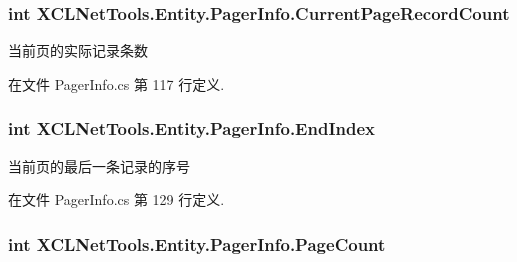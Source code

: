 \subsubsection[{\texorpdfstring{Current\+Page\+Record\+Count}{CurrentPageRecordCount}}]{\setlength{\rightskip}{0pt plus 5cm}int X\+C\+L\+Net\+Tools.\+Entity.\+Pager\+Info.\+Current\+Page\+Record\+Count\hspace{0.3cm}{\ttfamily [get]}}\hypertarget{class_x_c_l_net_tools_1_1_entity_1_1_pager_info_ac873f1babc543a806b6ec686bf9fc86a}{}\label{class_x_c_l_net_tools_1_1_entity_1_1_pager_info_ac873f1babc543a806b6ec686bf9fc86a}


当前页的实际记录条数 



在文件 Pager\+Info.\+cs 第 117 行定义.

\subsubsection[{\texorpdfstring{End\+Index}{EndIndex}}]{\setlength{\rightskip}{0pt plus 5cm}int X\+C\+L\+Net\+Tools.\+Entity.\+Pager\+Info.\+End\+Index\hspace{0.3cm}{\ttfamily [get]}}\hypertarget{class_x_c_l_net_tools_1_1_entity_1_1_pager_info_a9d9af42d4a2c5da6386e089dbb1d33ea}{}\label{class_x_c_l_net_tools_1_1_entity_1_1_pager_info_a9d9af42d4a2c5da6386e089dbb1d33ea}


当前页的最后一条记录的序号 



在文件 Pager\+Info.\+cs 第 129 行定义.

\subsubsection[{\texorpdfstring{Page\+Count}{PageCount}}]{\setlength{\rightskip}{0pt plus 5cm}int X\+C\+L\+Net\+Tools.\+Entity.\+Pager\+Info.\+Page\+Count\hspace{0.3cm}{\ttfamily [get]}}\hypertarget{class_x_c_l_net_tools_1_1_entity_1_1_pager_info_a986467ea00c659d4c81c036f2bfaa1b9}{}\label{class_x_c_l_net_tools_1_1_entity_1_1_pager_info_a986467ea00c659d4c81c036f2bfaa1b9}


